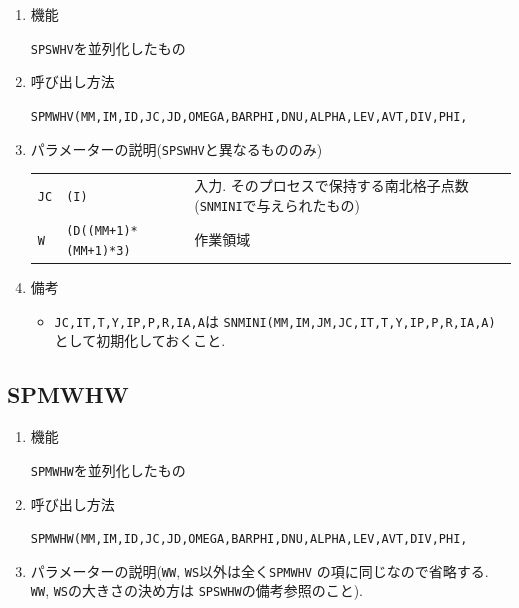 \begin{enumerate}

\item 機能

{\tt SPSWHV}を並列化したもの

\item 呼び出し方法 

{\tt SPMWHV(MM,IM,ID,JC,JD,OMEGA,BARPHI,DNU,ALPHA,LEV,AVT,DIV,PHI,}\\
\hspace*{10em}{\tt DAVT,DDIV,DPHI,RN,IRM,IT,T,Y,IP,P,R,IA,A,Q,WS,WW,W)}
  
\item パラメーターの説明({\tt SPSWHV}と異なるもののみ)

\begin{tabular}{lll}
{\tt JC} & {\tt (I)} & 入力. そのプロセスで保持する南北格子点数
                        ({\tt SNMINI}で与えられたもの)\\
{\tt W}  & {\tt (D((MM+1)*(MM+1)*3)} & 作業領域
\end{tabular}

\item 備考

\begin{itemize}

\item {\tt JC,IT,T,Y,IP,P,R,IA,A}は 
      {\tt SNMINI(MM,IM,JM,JC,IT,T,Y,IP,P,R,IA,A)} として初期化しておくこと.\\

\end{itemize}

\end{enumerate}


\subsection{SPMWHW}

\begin{enumerate}

\item 機能

{\tt SPMWHW}を並列化したもの

\item 呼び出し方法 

{\tt SPMWHW(MM,IM,ID,JC,JD,OMEGA,BARPHI,DNU,ALPHA,LEV,AVT,DIV,PHI,}\\
\hspace*{10em}{\tt DAVT,DDIV,DPHI,RN,IRM,IT,T,Y,IP,P,R,IA,A,Q,WS,WW,W)}
  
\item パラメーターの説明({\tt WW}, {\tt WS}以外は全く{\tt SPMWHV}
の項に同じなので省略する. {\tt WW}, {\tt WS}の大きさの決め方は
{\tt SPSWHW}の備考参照のこと).

\end{enumerate}

